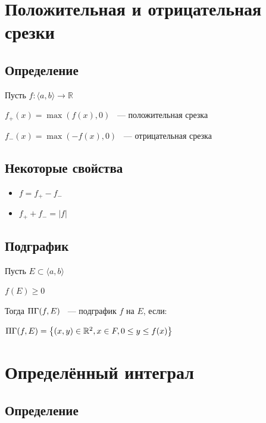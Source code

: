 \documentclass{article}
\begin{document}
	\newpage
	
	\section{Положительная и отрицательная срезки}
	
	    \subsection{Определение}
	    
	        Пусть $f : \langle a, b \rangle \rightarrow \mathbb{R}$
	    
	        $f_+ (x) = \max (f(x), 0)$ ~--- положительная срезка
	    
	        $f_- (x) = \max (-f(x), 0)$ ~--- отрицательная срезка
	    
	    \subsection{Некоторые свойства}
	    
	        \begin{itemize}
	    
	            \item $f = f_+ - f_-$
	        
	            \item $f_+ + f_- = |f|$
	        
	        \end{itemize}
	    
	    \subsection{Подграфик}
	    
            Пусть $E \subset \langle a, b \rangle$
        
            $f(E) \geq 0$
        
            Тогда $\Pi\Gamma(f, E)$ ~--- подграфик $f$ на $E$, если:
        
	        $\Pi\Gamma (f, E) = \left\{ (x, y) \in \mathbb{R}^2, x \in F, 0 \leq y \leq f(x) \right\}$
	    
	\newpage

	\section{Определённый интеграл}

        \subsection{Определение}
        
\end{document}
